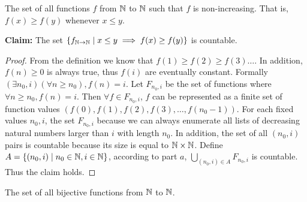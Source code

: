 \documentclass[11pt]{article}
\begin{document}
\begin{Parts}
    \newpage
    \Part The set of all functions $f$ from $\mathbb{N}$ to $\mathbb{N}$ such that $f$ is non-increasing. That is, $f(x) \geq f(y)$ whenever $x \leq y$.

    \begin{Answer}
        \textbf{Claim:} The set $\{f_{\mathbb{N} \to \mathbb{N}} \mid x \leq y \implies f(x) \geq f(y)\}$ is countable. 
        \begin{proof}
            From the definition we know that $f(1) \geq f(2) \geq f(3) \ldots$. In addition, $f(n) \geq 0$ is always true, thus $f(i)$ 
            are eventually constant. Formally $(\exists n_0,i)(\forall n \geq n_0), f(n) = i$. Let $F_{n_0,i}$ be the set of 
            functions where $\forall n \geq n_0, f(n) = i$. Then $\forall f \in F_{n_0,i}$, $f$ can be represented as a finite set of 
            function values $(f(0), f(1),f(2),f(3),\ldots,f(n_0-1))$. For each fixed values $n_0, i$, the set $F_{n_0,i}$ because we can
            always enumerate all lists of decreasing natural numbers larger than $i$ with length $n_0$. In addition, the set of all 
            $(n_0,i)$ pairs is countable because its size is equal to $\mathbb{N} \times \mathbb{N}$. Define $A = \{(n_0,i) \mid n_0 \in \mathbb{N}, i \in \mathbb{N}\}$,
            according to part $a$, $\bigcup_{(n_0,i) \in A} F_{n_0,i}$ is countable. Thus the claim holds. 
        \end{proof}
    \end{Answer}
    
    \Part The set of all bijective functions from $\mathbb{N}$ to $\mathbb{N}$.


\end{Parts}
\end{document}
